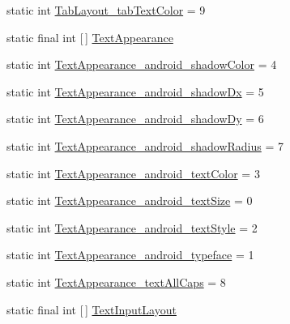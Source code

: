 \begin{DoxyCompactItemize}
\item 
static int \hyperlink{classandroid_1_1support_1_1v7_1_1cardview_1_1R_1_1styleable_a7fa5e53bc11e58338a76405ddc2a9fd8}{Tab\+Layout\+\_\+tab\+Text\+Color} = 9
\item 
static final int \mbox{[}$\,$\mbox{]} \hyperlink{classandroid_1_1support_1_1v7_1_1cardview_1_1R_1_1styleable_aac90085e3889272ab1a7da34a6c5ed38}{Text\+Appearance}
\item 
static int \hyperlink{classandroid_1_1support_1_1v7_1_1cardview_1_1R_1_1styleable_ac30541b7e882b5cbeca1ff294370508f}{Text\+Appearance\+\_\+android\+\_\+shadow\+Color} = 4
\item 
static int \hyperlink{classandroid_1_1support_1_1v7_1_1cardview_1_1R_1_1styleable_af78673669143ecb19f5c6539038cdabd}{Text\+Appearance\+\_\+android\+\_\+shadow\+Dx} = 5
\item 
static int \hyperlink{classandroid_1_1support_1_1v7_1_1cardview_1_1R_1_1styleable_aa8978ddd3e66c4c1da6e6c1ca8143122}{Text\+Appearance\+\_\+android\+\_\+shadow\+Dy} = 6
\item 
static int \hyperlink{classandroid_1_1support_1_1v7_1_1cardview_1_1R_1_1styleable_a0db854c5b0c5d17f58df560fc89ed0c3}{Text\+Appearance\+\_\+android\+\_\+shadow\+Radius} = 7
\item 
static int \hyperlink{classandroid_1_1support_1_1v7_1_1cardview_1_1R_1_1styleable_ab57942af638bda029a3f64c2f23ca03b}{Text\+Appearance\+\_\+android\+\_\+text\+Color} = 3
\item 
static int \hyperlink{classandroid_1_1support_1_1v7_1_1cardview_1_1R_1_1styleable_a9efe0769c1cb5492f1c2b8ff53b75f49}{Text\+Appearance\+\_\+android\+\_\+text\+Size} = 0
\item 
static int \hyperlink{classandroid_1_1support_1_1v7_1_1cardview_1_1R_1_1styleable_a2c5c2ce44fa4c6ed998a5a0580c7e67b}{Text\+Appearance\+\_\+android\+\_\+text\+Style} = 2
\item 
static int \hyperlink{classandroid_1_1support_1_1v7_1_1cardview_1_1R_1_1styleable_a3626f3ceb70d84f1c812ff1954d363f0}{Text\+Appearance\+\_\+android\+\_\+typeface} = 1
\item 
static int \hyperlink{classandroid_1_1support_1_1v7_1_1cardview_1_1R_1_1styleable_abc7c3f256d837bdb4a0b5aee27f448aa}{Text\+Appearance\+\_\+text\+All\+Caps} = 8
\item 
static final int \mbox{[}$\,$\mbox{]} \hyperlink{classandroid_1_1support_1_1v7_1_1cardview_1_1R_1_1styleable_a9b23c31ffaf354f0f5cc4b82392ef6a4}{Text\+Input\+Layout}
\item 

\end{DoxyCompactItemize}
